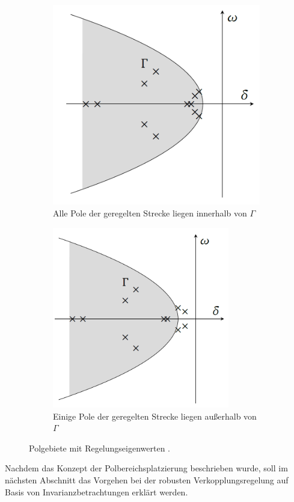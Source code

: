 \begin{figure}[h]
	\centering
	\begin{subfigure}[b]{0.35\textwidth}
		\centering
		\includegraphics[width=\textwidth]{./Bilder/PolgebKorrekt.png}
		\caption{Alle Pole der geregelten Strecke liegen innerhalb von $\Gamma$}
		\label{fig:PolgebKorrekt}
	\end{subfigure}
	\hspace{0.1\textwidth}
	\begin{subfigure}[b]{0.35\textwidth}
		\centering
		\includegraphics[width=0.85\textwidth]{./Bilder/PolgebFalsch.png}
		\caption{Einige Pole der geregelten Strecke liegen außerhalb von $\Gamma$}
		\label{fig:PolgebFalsch}
	\end{subfigure}
	\caption{Polgebiete mit Regelungseigenwerten \cite{Schaub}.}
	\label{fig:PolGeb}
\end{figure}
Nachdem das Konzept der Polbereichsplatzierung beschrieben wurde, soll im nächsten Abschnitt das Vorgehen bei der robusten Verkopplungsregelung auf Basis von Invarianzbetrachtungen erklärt werden.\\
